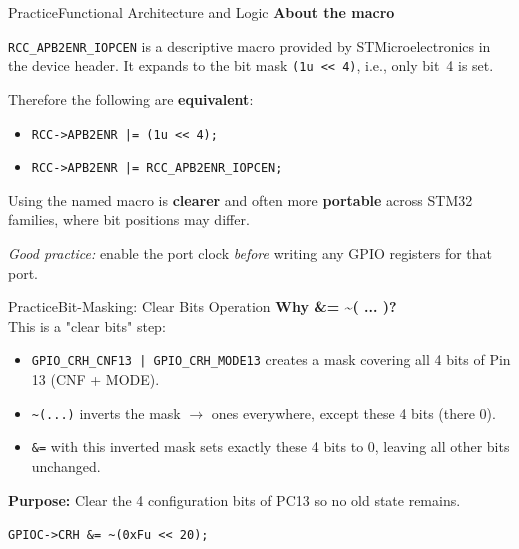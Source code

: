 \documentclass{beamer}
\begin{document}
\begin{frame}{Practice}{Functional Architecture and Logic}
	\textbf{About the macro}
	\medskip
	
	\texttt{RCC\_APB2ENR\_IOPCEN} is a descriptive macro provided by STMicroelectronics in the device header.
	It expands to the bit mask \texttt{(1u << 4)}, i.e., only bit~4 is set.
	
	\medskip
	Therefore the following are \textbf{equivalent}:
	\begin{itemize}
		\item \texttt{RCC->APB2ENR |= (1u << 4);}
		\item \texttt{RCC->APB2ENR |= RCC\_APB2ENR\_IOPCEN;}
	\end{itemize}
	
	Using the named macro is \textbf{clearer} and often more \textbf{portable} across STM32 families,
	where bit positions may differ.
	
	\medskip
	\textit{Good practice:} enable the port clock \emph{before} writing any GPIO registers for that port.
\end{frame}
\begin{frame}[fragile]{Practice}{Bit-Masking: Clear Bits Operation}
	\textbf{Why \&= \textasciitilde( ... )?}\\
	This is a "clear bits" step:
	\begin{itemize}
		\item \texttt{GPIO\_CRH\_CNF13 | GPIO\_CRH\_MODE13} creates a mask covering all 4 bits of Pin 13 (CNF + MODE).
		\item \texttt{\textasciitilde(...)} inverts the mask $\rightarrow$ ones everywhere, except these 4 bits (there 0).
		\item \texttt{\&=} with this inverted mask sets exactly these 4 bits to 0, leaving all other bits unchanged.
	\end{itemize}
	\textbf{Purpose:} Clear the 4 configuration bits of PC13 so no old state remains.
	\medskip
	
	\texttt{GPIOC->CRH \&= \textasciitilde(0xFu << 20);}
\end{frame}
\end{document}
